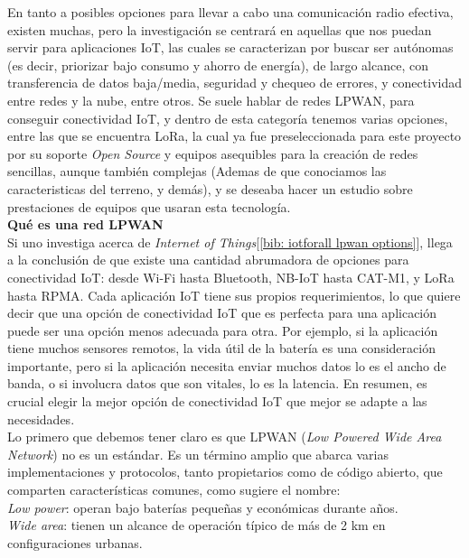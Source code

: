 \documentclass[12pt]{article}
\begin{document}
	\noindent En tanto a posibles opciones para llevar a cabo una comunicación radio efectiva, existen muchas, pero la investigación se centrará en aquellas que nos puedan servir para aplicaciones IoT, las cuales se caracterizan por buscar ser autónomas (es decir, priorizar bajo consumo y ahorro de energía), de largo alcance, con transferencia de datos baja/media, seguridad y chequeo de errores, y conectividad entre redes y la nube, entre otros. Se suele hablar de redes LPWAN, para conseguir conectividad IoT, y dentro de esta categoría tenemos varias opciones, entre las que se encuentra LoRa, la cual ya fue preseleccionada para este proyecto por su soporte \textit{Open Source} y equipos asequibles para la creación de redes sencillas, aunque también complejas (Ademas de que conociamos las caracteristicas del terreno, y demás), y se deseaba hacer un estudio sobre prestaciones de equipos que usaran esta tecnología.\\
	
	\noindent \textbf{Qué es una red LPWAN} \\
	
	\noindent Si uno investiga acerca de \textit{Internet of Things}[\ref{bib: iotforall lpwan options}], llega a la conclusión de que existe una cantidad abrumadora de opciones para conectividad IoT: desde Wi-Fi hasta Bluetooth, NB-IoT hasta CAT-M1, y LoRa hasta RPMA. Cada aplicación IoT tiene sus propios requerimientos, lo que quiere decir que una opción de conectividad IoT que es perfecta para una aplicación puede ser una opción menos adecuada para otra. Por ejemplo, si la aplicación tiene muchos sensores remotos, la vida útil de la batería es una consideración importante, pero si la aplicación necesita enviar muchos datos lo es el ancho de banda, o si involucra datos que son vitales, lo es la latencia. En resumen, es crucial elegir la mejor opción de conectividad IoT que mejor se adapte a las necesidades. \\
	
	\noindent Lo primero que debemos tener claro es que LPWAN (\textit{Low Powered Wide Area Network}) no es un estándar. Es un término amplio que abarca varias implementaciones y protocolos, tanto propietarios como de código abierto, que comparten características comunes, como sugiere el nombre: \\
	
	\noindent \textit{Low power}: operan bajo baterías pequeñas y económicas durante años. \\
	
	\noindent \textit{Wide area}: tienen un alcance de operación típico de más de 2 km en configuraciones urbanas.\\
	
\end{document}

